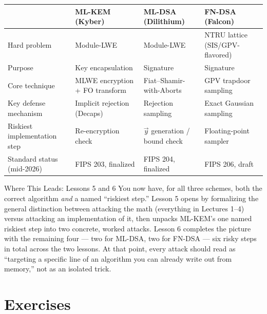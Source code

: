 \begin{center}
\renewcommand{\arraystretch}{1.35}
\footnotesize
\begin{tabular}{|p{2.6cm}|p{3.1cm}|p{3.4cm}|p{3.4cm}|}
\hline
& \textbf{ML-KEM (Kyber)} & \textbf{ML-DSA (Dilithium)} & \textbf{FN-DSA (Falcon)} \\
\hline
Hard problem & Module-LWE & Module-LWE & NTRU lattice (SIS/GPV-flavored) \\
Purpose & Key encapsulation & Signature & Signature \\
Core technique & MLWE encryption + FO transform & Fiat--Shamir-with-Aborts & GPV trapdoor sampling \\
Key defense mechanism & Implicit rejection (Decaps) & Rejection sampling & Exact Gaussian sampling \\
Riskiest implementation step & Re-encryption check & $\vec y$ generation / bound check & Floating-point sampler \\
Standard status (mid-2026) & FIPS 203, finalized & FIPS 204, finalized & FIPS 206, draft \\
\hline
\end{tabular}
\end{center}

\begin{previewbox}{Where This Leads: Lessons 5 and 6}
You now have, for all three schemes, both the correct algorithm \emph{and} a named ``riskiest step.'' Lesson 5 opens by formalizing the general distinction between attacking the math (everything in Lectures 1--4) versus attacking an implementation of it, then unpacks ML-KEM's one named riskiest step into two concrete, worked attacks. Lesson 6 completes the picture with the remaining four --- two for ML-DSA, two for FN-DSA --- six risky steps in total across the two lessons. At that point, every attack should read as ``targeting a specific line of an algorithm you can already write out from memory,'' not as an isolated trick.
\end{previewbox}

\section{Exercises}
\label{sec:L4:exercises}

